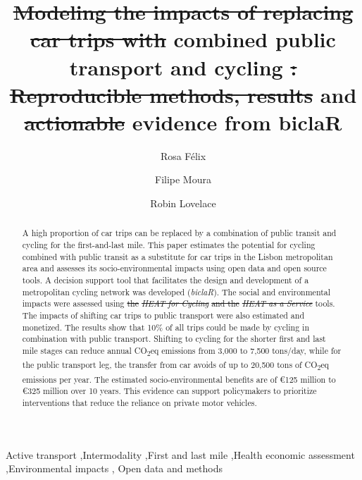 \documentclass[review, doubleblind, 3p,
authoryear]{elsarticle} %
\providecommand{\DIFaddtex}[1]{{\protect\color{green}{#1}}} %
\providecommand{\DIFdeltex}[1]{{\protect\color{red}\sout{#1}}}                      %
\providecommand{\DIFaddbegin}{} %
\providecommand{\DIFaddend}{} %
\providecommand{\DIFdelbegin}{} %
\providecommand{\DIFdelend}{} %
\providecommand{\DIFadd}[1]{\texorpdfstring{\DIFaddtex{#1}}{#1}} %
\providecommand{\DIFdel}[1]{\texorpdfstring{\DIFdeltex{#1}}{}} %
\newcommand{\DIFscaledelfig}{0.5}
\newlength{\DIFdelgraphicswidth} %
\newlength{\DIFdelgraphicsheight} %
\newcommand{\DIFaddincludegraphics}[2][]{{\color{blue}\fbox{\DIFOincludegraphics[#1]{#2}}}} %
\newcommand{\DIFdelincludegraphics}[2][]{%
\sbox{\DIFdelgraphicsbox}{\DIFOincludegraphics[#1]{#2}}%
\settoboxwidth{\DIFdelgraphicswidth}{\DIFdelgraphicsbox} %
\settoboxtotalheight{\DIFdelgraphicsheight}{\DIFdelgraphicsbox} %
\scalebox{\DIFscaledelfig}{%
\parbox[b]{\DIFdelgraphicswidth}{\usebox{\DIFdelgraphicsbox}\\[-\baselineskip] \rule{\DIFdelgraphicswidth}{0em}}\llap{\resizebox{\DIFdelgraphicswidth}{\DIFdelgraphicsheight}{%
\setlength{\unitlength}{\DIFdelgraphicswidth}%
\begin{picture}(1,1)%
\thicklines\linethickness{2pt} %
{\color[rgb]{1,0,0}\put(0,0){\framebox(1,1){}}}%
{\color[rgb]{1,0,0}\put(0,0){\line( 1,1){1}}}%
{\color[rgb]{1,0,0}\put(0,1){\line(1,-1){1}}}%
\end{picture}%
}\hspace*{3pt}}} %
} %
\DeclareRobustCommand{\DIFaddbegin}{\DIFOaddbegin \let\includegraphics\DIFaddincludegraphics} %
\DeclareRobustCommand{\DIFaddend}{\DIFOaddend \let\includegraphics\DIFOincludegraphics} %
\DeclareRobustCommand{\DIFdelbegin}{\DIFOdelbegin \let\includegraphics\DIFdelincludegraphics} %
\DeclareRobustCommand{\DIFdelend}{\DIFOaddend \let\includegraphics\DIFOincludegraphics} %
\begin{document}
\begin{frontmatter}

  \title{\DIFdelbegin \DIFdel{Modeling the impacts of replacing car trips with }\DIFdelend \DIFaddbegin \DIFadd{Reproducible methods for modeling }\DIFaddend combined public transport and
cycling \DIFdelbegin \DIFdel{: Reproducible methods, results }\DIFdelend \DIFaddbegin \DIFadd{trips }\DIFaddend and \DIFdelbegin \DIFdel{actionable }\DIFdelend \DIFaddbegin \DIFadd{associated benefits: }\DIFaddend evidence from \DIFaddbegin \DIFadd{the }\DIFaddend biclaR \DIFaddbegin \DIFadd{tool}\DIFaddend }
    \author[CERIS]{Rosa Félix%
  }
    \author[CERIS]{Filipe Moura%
  }
    \author[ITS]{Robin Lovelace%
  }
      \DIFdelbegin %
\DIFdelend \DIFaddbegin {}
    \DIFaddend {}

  \begin{abstract}
  A high proportion of car trips can be replaced by a combination of
  public transit and cycling for the first-and-last mile. This paper
  estimates the potential for cycling combined with public transit as a
  substitute for car trips in the Lisbon metropolitan area and assesses
  its socio-environmental impacts using open data and open source tools.
  A decision support tool that facilitates the design and development of
  a metropolitan cycling network was developed (\emph{biclaR}). The
  social and environmental impacts were assessed using \DIFdelbegin \DIFdel{the }\emph{\DIFdel{HEAT
  for Cycling}} %
\DIFdel{and the }\emph{\DIFdel{HEAT as a Service}} %
\DIFdelend \DIFaddbegin \DIFadd{Health World
  Organization }\DIFaddend tools. The impacts of shifting car trips to public
  transport were also estimated and monetized. The results show that
  10\% of all trips could be made by cycling in combination with public
  transport. Shifting to cycling for the shorter first and last mile
  stages can reduce annual CO\textsubscript{2}eq emissions from 3,000 to
  7,500 tons/day, while for the public transport leg, the transfer from
  car avoids of up to 20,500 tons of CO\textsubscript{2}eq emissions per
  year. The estimated socio-environmental benefits are of €125 million
  to €325 million over 10 years. This evidence can support policymakers
  to prioritize interventions that reduce the reliance on private motor
  vehicles.\\
  \end{abstract}
    \begin{keyword}
    Active transport \sep Intermodality \sep First and last
mile \sep Health economic assessment \sep Environmental impacts \sep 
    Open data and methods
  \end{keyword}


\end{frontmatter}
\end{document}
